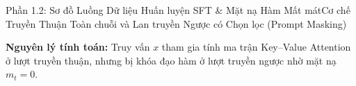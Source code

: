 \begin{frame}{Phần 1.2: Sơ đồ Luồng Dữ liệu Huấn luyện SFT \& Mặt nạ Hàm Mất mát}{Cơ chế Truyền Thuận Toàn chuỗi và Lan truyền Ngược có Chọn lọc (Prompt Masking)}
\begin{center}
{%
    }
  \end{center}
  \vspace{-0.05cm}
  \footnotesize
  \textbf{Nguyên lý tính toán:} Truy vấn $x$ tham gia tính ma trận Key--Value Attention ở lượt truyền thuận, nhưng bị khóa đạo hàm ở lượt truyền ngược nhờ mặt nạ $m_t = 0$.
\end{frame}

